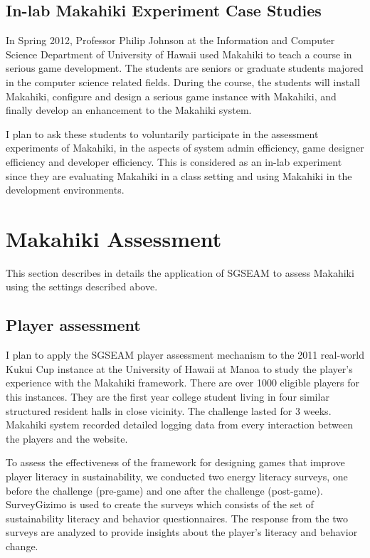 \subsection{In-lab Makahiki Experiment Case Studies}

In Spring 2012, Professor Philip Johnson at the Information and Computer Science Department of University of Hawaii used Makahiki to teach a course in serious game development. The students are seniors or graduate students majored in the computer science related fields. During the course, the students will install Makahiki, configure and design a serious game instance with Makahiki, and finally develop an enhancement to the Makahiki system.

I plan to ask these students to voluntarily participate in the assessment experiments of Makahiki, in the aspects of system admin efficiency, game designer efficiency and developer efficiency. This is considered as an in-lab experiment since they are evaluating Makahiki in a class setting and using Makahiki in the development environments.

\section{Makahiki Assessment}
This section describes in details the application of SGSEAM to assess Makahiki using the settings described above.

\subsection{Player assessment}

I plan to apply the SGSEAM player assessment mechanism to the 2011 real-world Kukui Cup instance at the University of Hawaii at Manoa to study the player's experience with the Makahiki framework. There are over 1000 eligible players for this instances. They are the first year college student living in four similar structured resident halls in close vicinity. The challenge lasted for 3 weeks. Makahiki system recorded detailed logging data from every interaction between the players and the website.

To assess the effectiveness of the framework for designing games that improve player literacy in sustainability, we
conducted two energy literacy surveys, one before the challenge (pre-game) and one after
the challenge (post-game). SurveyGizimo is used to create the surveys which consists of the set of sustainability literacy and behavior questionnaires. The response from the two surveys are analyzed to provide insights about the player's literacy and behavior change.

